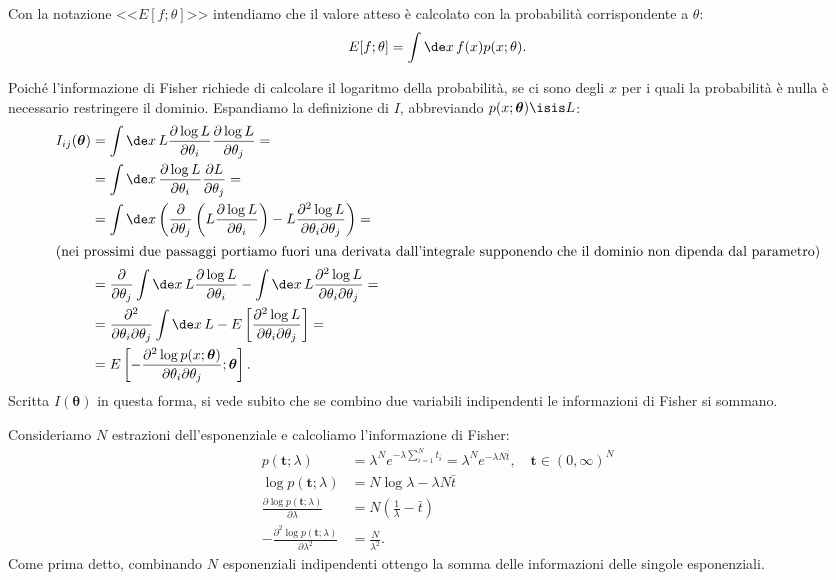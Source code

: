 Con la notazione <<$E[f;\theta]$>> intendiamo che
il valore atteso è calcolato con la probabilità corrispondente a $\theta$:
\begin{equation*}
	E[f;\theta] = \int \de x\, f(x) p(x;\theta).
\end{equation*}

Poiché l'informazione di Fisher richiede di calcolare il logaritmo della probabilità,
se ci sono degli $x$ per i quali la probabilità è nulla
è necessario restringere il dominio.
Espandiamo la definizione di $I$, abbreviando $p(x;\boldsymbol\theta)\isis L$:
\begin{align*}
	I_{ij}(\boldsymbol\theta)
	&= \int\de x\, L
	\frac{\partial\log L}{\partial\theta_i}
	\frac{\partial\log L}{\partial\theta_j} = \\
	&= \int\de x\,
	\frac{\partial\log L}{\partial\theta_i}
	\frac{\partial L}{\partial\theta_j} = \\
	&= \int\de x \left(
	\frac{\partial}{\partial\theta_j} \left( L \frac{\partial\log L}{\partial\theta_i} \right)
	- L \frac{\partial^2\log L}{\partial\theta_i\partial\theta_j} \right) = \\
	\intertext{(nei prossimi due passaggi portiamo fuori una derivata dall'integrale supponendo che il dominio non dipenda dal parametro)}
	&= \frac{\partial}{\partial\theta_j} \int\de x\, L \frac{\partial\log L}{\partial\theta_i}
	- \int\de x\, L \frac{\partial^2\log L}{\partial\theta_i\partial\theta_j} = \\
	&= \frac{\partial^2}{\partial\theta_i\partial\theta_j} \int\de x\, L
	- E \left[ \frac{\partial^2\log L}{\partial\theta_i\partial\theta_j} \right] = \\
	&= E \left[ -\frac{\partial^2\log p(x;\boldsymbol\theta)}{\partial\theta_i\partial\theta_j};\boldsymbol\theta \right].
\end{align*}
%
Scritta $I(\boldsymbol\theta)$ in questa forma, si vede subito che se combino
due variabili indipendenti le informazioni di Fisher si
sommano.

\begin{example}
	Consideriamo $N$ estrazioni dell'esponenziale e calcoliamo l'informazione di Fisher:
	\begin{align*}
		p(\mathbf t;\lambda)
		&= \lambda^N e^{-\lambda\sum_{i=1}^N t_i}
		= \lambda^N e^{-\lambda N \bar t}, \quad \mathbf t\in(0,\infty)^N \\
		\log p(\mathbf t;\lambda)
		&= N\log\lambda - \lambda N\bar t \\
		\frac{\partial \log p(\mathbf t;\lambda)}{\partial\lambda}
		&= N \left( \frac1\lambda - \bar t \right) \\
		-\frac{\partial^2 \log p(\mathbf t;\lambda)}{\partial\lambda^2}
		&= \frac N{\lambda^2}.
	\end{align*}
	Come prima detto, combinando $N$ esponenziali indipendenti ottengo la somma delle informazioni delle singole esponenziali.
\end{example}

